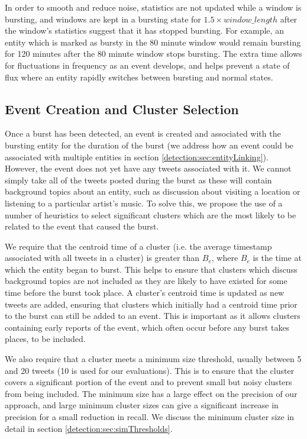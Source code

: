 In order to smooth and reduce noise, statistics are not updated while a window is bursting, and windows are kept in a bursting state for \(1.5 \times window\_length\) after the window's statistics suggest that it has stopped bursting. For example, an entity which is marked as bursty in the 80 minute window would remain bursting for 120 minutes after the 80 minute window stops bursting.  The extra time allows for fluctuations in frequency as an event develops, and helps prevent a state of flux where an entity rapidly switches between bursting and normal states.

\subsection{Event Creation and Cluster Selection}
\label{detection:sec:eventCreation}
Once a burst has been detected, an event is created and associated with the bursting entity for the duration of the burst (we address how an event could be associated with multiple entities in section \ref{detection:sec:entityLinking}).
However, the event does not yet have any tweets associated with it.
We cannot simply take all of the tweets posted during the burst as these will contain background topics about an entity, such as discussion about visiting a location or listening to a particular artist's music. To solve this, we propose the use of a number of heuristics to select significant clusters which are the most likely to be related to the event that caused the burst.

We require that the centroid time of a cluster (i.e. the average timestamp associated with all tweets in a cluster) is greater than \(B_e\), where \(B_e\) is the time at which the entity began to burst. This helps to ensure that clusters which discuss background topics are not included as they are likely to have existed for some time before the burst took place. A cluster's centroid time is updated as new tweets are added, ensuring that clusters which initially had a centroid time prior to the burst can still be added to an event. This is important as it allows clusters containing early reports of the event, which often occur before any burst takes places, to be included.

We also require that a cluster meets a minimum size threshold, usually between 5 and 20 tweets (10 is used for our evaluations).
This is to ensure that the cluster covers a significant portion of the event and to prevent small but noisy clusters from being included. The minimum size has a large effect on the precision of our approach, and large minimum cluster sizes can give a significant increase in precision for a small reduction in recall. We discuss the minimum cluster size in detail in section \ref{detection:sec:simThresholds}.

